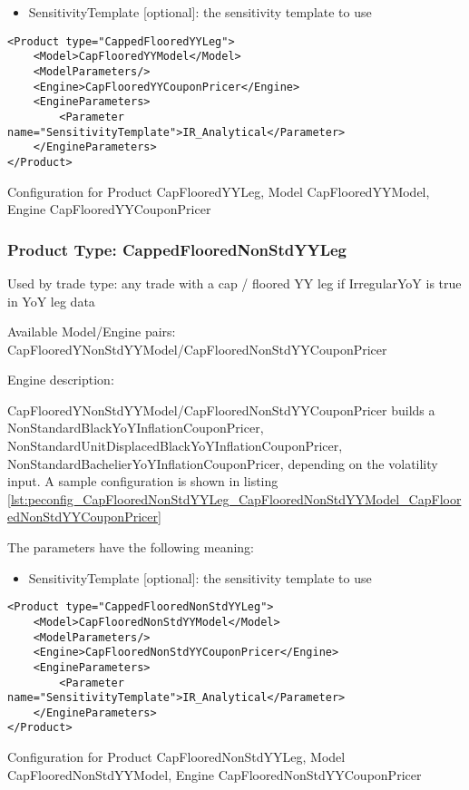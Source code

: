 \begin{itemize}
\item SensitivityTemplate [optional]: the sensitivity template to use 
\end{itemize}

\begin{longlisting}
\begin{verbatim}
<Product type="CappedFlooredYYLeg">
    <Model>CapFlooredYYModel</Model>
    <ModelParameters/>
    <Engine>CapFlooredYYCouponPricer</Engine>
    <EngineParameters>
        <Parameter name="SensitivityTemplate">IR_Analytical</Parameter>
    </EngineParameters>
</Product>
\end{verbatim}
\caption{Configuration for Product CapFlooredYYLeg, Model CapFlooredYYModel, Engine CapFlooredYYCouponPricer}
\label{lst:peconfig_CapFlooredYYLeg_CapFlooredYYModel_CapFlooredYYCouponPricer}
\end{longlisting}

\subsubsection{Product Type: CappedFlooredNonStdYYLeg}

Used by trade type: any trade with a cap / floored YY leg if IrregularYoY is true in YoY leg data

Available Model/Engine pairs: CapFlooredYNonStdYYModel/CapFlooredNonStdYYCouponPricer

Engine description:

CapFlooredYNonStdYYModel/CapFlooredNonStdYYCouponPricer builds a NonStandardBlackYoYInflationCouponPricer,
NonStandardUnitDisplacedBlackYoYInflationCouponPricer, NonStandardBachelierYoYInflationCouponPricer, depending on the
volatility input. A sample configuration is shown in listing
\ref{lst:peconfig_CapFlooredNonStdYYLeg_CapFlooredNonStdYYModel_CapFlooredNonStdYYCouponPricer}

The parameters have the following meaning:

\begin{itemize}
\item SensitivityTemplate [optional]: the sensitivity template to use 
\end{itemize}

\begin{longlisting}
\begin{verbatim}
<Product type="CappedFlooredNonStdYYLeg">
    <Model>CapFlooredNonStdYYModel</Model>
    <ModelParameters/>
    <Engine>CapFlooredNonStdYYCouponPricer</Engine>
    <EngineParameters>
        <Parameter name="SensitivityTemplate">IR_Analytical</Parameter>
    </EngineParameters>
</Product>
\end{verbatim}
\caption{Configuration for Product CapFlooredNonStdYYLeg, Model CapFlooredNonStdYYModel, Engine
  CapFlooredNonStdYYCouponPricer}
\label{lst:peconfig_CapFlooredNonStdYYLeg_CapFlooredNonStdYYModel_CapFlooredNonStdYYCouponPricer}
\end{longlisting}

